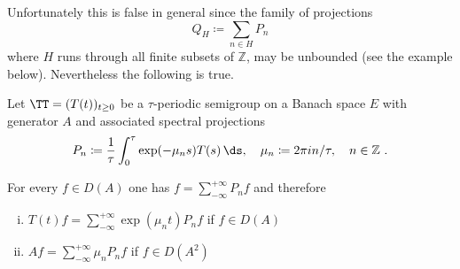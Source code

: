 Unfortunately this is false in general since the family of projections
\[
Q_{H} \coloneqq \sum_{n \in H} P_{n}
\]
where $H$ runs through all finite subsets of $\mathbb{Z}$, may be unbounded (see the example below).
Nevertheless the following is true.


\begin{theorem}\label{thm:a3-5.4}

Let $\TT = (T(t))_{t \geq 0}$ be a $\tau$-periodic semigroup on a Banach space $E$ with generator $A$ and associated spectral projections
\[
P_{n} \coloneqq  \frac{1}{\tau}\int_{0}^{\tau} \exp(-\mu_{n}s)T(s) \, \ds, \quad \mu_{n} \coloneqq 2\pi in/\tau, \quad n \in \mathbb{Z} ~.
\]

For every $f \in D(A)$ one has $f = \sum_{-\infty}^{+\infty} P_{n}f$ and therefore
\begin{enumerate}[(i)]
\item 
$T(t)f = \sum_{-\infty}^{+\infty} \exp(\mu_{n}t)P_{n}f$ \quad if $f \in D(A)$

\item 
$Af = \sum_{-\infty}^{+\infty} \mu_{n}P_{n}f$ \quad if $f \in D(A^{2})$
\end{enumerate}
\end{theorem}

